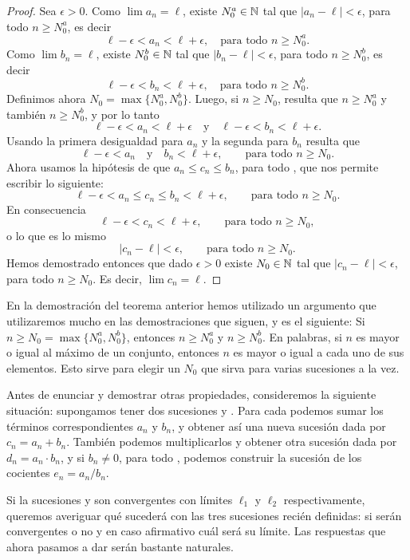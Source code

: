 \begin{proof}
Sea $\epsilon > 0$.
Como $\lim a_n = \ell$, existe $N_0^a \in \mathbb{N}$ tal que $|a_n - \ell| < \epsilon $, para todo $n\ge N_0^a$, es decir
\[
\ell-\epsilon < a_n < \ell + \epsilon , \quad \text{para todo $n\ge N_0^a$}.
\]
Como $\lim b_n = \ell$, existe $N_0^b \in \mathbb{N}$ tal que $|b_n - \ell| < \epsilon $, para todo $n\ge N_0^b$, es decir
\[
\ell-\epsilon < b_n < \ell + \epsilon , \quad \text{para todo $n\ge N_0^b$}.
\]
Definimos ahora $N_0 = \max\{N_0^a,N_0^b\}$. Luego, si $n\ge N_0$, resulta que $n\ge N_0^a$ y también $n \ge N_0^b$, y por lo tanto
\[
\ell-\epsilon < a_n < \ell + \epsilon\quad\text{y}\quad\ell-\epsilon < b_n < \ell + \epsilon.
\]
Usando la primera desigualdad para $a_n$ y la segunda para $b_n$ resulta que
\[
\ell-\epsilon < a_n \quad\text{y}\quad b_n < \ell + \epsilon, \qquad\text{para todo $n \ge N_0$}.
\]
Ahora usamos la hipótesis de que $a_n \le c_n \le b_n$, para todo \niN, que nos permite escribir lo siguiente:
\[
\ell-\epsilon < a_n \le c_n \le b_n < \ell + \epsilon, \qquad\text{para todo $n \ge N_0$}.
\]
En consecuencia
\[
\ell-\epsilon < c_n < \ell + \epsilon, \qquad\text{para todo $n \ge N_0$},
\]
o lo que es lo mismo
\[
|c_n - \ell| < \epsilon, \qquad\text{para todo $n \ge N_0$}.
\]
Hemos demostrado entonces que dado $\epsilon > 0$ existe $N_0\in\mathbb{N}$ tal que $|c_n - \ell| < \epsilon$, para todo $n \ge N_0$. Es decir, $\lim c_n = \ell$.
\end{proof}

En la demostración del teorema anterior hemos utilizado un argumento que utilizaremos mucho en las demostraciones que siguen, y es el siguiente: Si $n \ge N_0 = \max\{N_0^a, N_0^b\}$, entonces $n\ge N_0^a$ y $n\ge N_0^b$. En palabras, si $n$ es mayor o igual al máximo de un conjunto, entonces $n$ es mayor o igual a cada uno de sus elementos. Esto sirve para elegir un $N_0$ que sirva para varias sucesiones a la vez.

Antes de enunciar y demostrar otras propiedades, consideremos la siguiente situación: supongamos tener dos sucesiones \sucan y \sucbn. Para cada \niN podemos sumar los términos correspondientes $a_n$ y $b_n$, y obtener así una nueva sucesión dada por $c_n=a_n+b_n$. También podemos multiplicarlos y obtener otra sucesión dada por $d_n = a_n\cdot b_n$, y si $b_n\neq 0$, para todo \niN, podemos construir la sucesión de los cocientes $e_n = a_n/b_n$.

Si la sucesiones \sucan y \sucbn son convergentes con límites $\ell_1$  y 
$\ell_2$  respectivamente, queremos averiguar qué sucederá con las tres sucesiones recién definidas: si serán convergentes o no y en caso afirmativo cuál será su límite. Las respuestas que ahora pasamos a dar serán bastante naturales.

